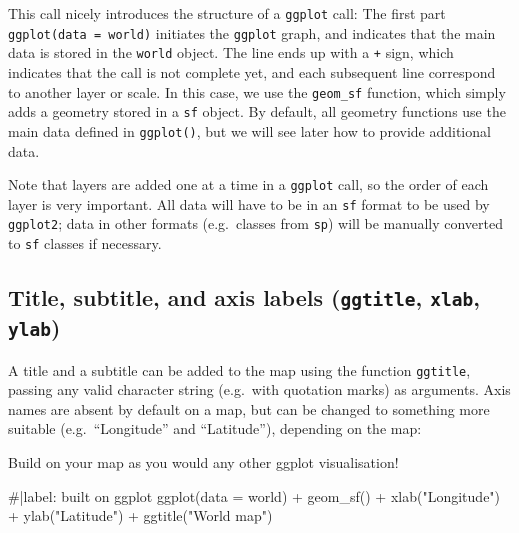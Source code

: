 \documentclass[
  letterpaper,
  DIV=11,
  numbers=noendperiod]{scrartcl}
\newenvironment{Shaded}{\begin{snugshade}}{\end{snugshade}}
\newcommand{\AttributeTok}[1]{\textcolor[rgb]{0.40,0.45,0.13}{#1}}
\newcommand{\CommentTok}[1]{\textcolor[rgb]{0.37,0.37,0.37}{#1}}
\newcommand{\FunctionTok}[1]{\textcolor[rgb]{0.28,0.35,0.67}{#1}}
\newcommand{\NormalTok}[1]{\textcolor[rgb]{0.00,0.23,0.31}{#1}}
\newcommand{\SpecialCharTok}[1]{\textcolor[rgb]{0.37,0.37,0.37}{#1}}
\newcommand{\StringTok}[1]{\textcolor[rgb]{0.13,0.47,0.30}{#1}}
\begin{document}
This call nicely introduces the structure of a \texttt{ggplot} call: The
first part \texttt{ggplot(data\ =\ world)} initiates the \texttt{ggplot}
graph, and indicates that the main data is stored in the \texttt{world}
object. The line ends up with a \texttt{+} sign, which indicates that
the call is not complete yet, and each subsequent line correspond to
another layer or scale. In this case, we use the \texttt{geom\_sf}
function, which simply adds a geometry stored in a \texttt{sf} object.
By default, all geometry functions use the main data defined in
\texttt{ggplot()}, but we will see later how to provide additional data.

Note that layers are added one at a time in a \texttt{ggplot} call, so
the order of each layer is very important. All data will have to be in
an \texttt{sf} format to be used by \texttt{ggplot2}; data in other
formats (e.g.~classes from \texttt{sp}) will be manually converted to
\texttt{sf} classes if necessary.

\hypertarget{title-subtitle-and-axis-labels-ggtitle-xlab-ylab}{%
\subsection{\texorpdfstring{Title, subtitle, and axis labels
(\texttt{ggtitle}, \texttt{xlab},
\texttt{ylab})}{Title, subtitle, and axis labels (ggtitle, xlab, ylab)}}\label{title-subtitle-and-axis-labels-ggtitle-xlab-ylab}}

A title and a subtitle can be added to the map using the function
\texttt{ggtitle}, passing any valid character string (e.g.~with
quotation marks) as arguments. Axis names are absent by default on a
map, but can be changed to something more suitable (e.g.~``Longitude''
and ``Latitude''), depending on the map:

Build on your map as you would any other ggplot visualisation!

\begin{Shaded}
\begin{Highlighting}[]
\CommentTok{\#|label: built on ggplot}
\FunctionTok{ggplot}\NormalTok{(}\AttributeTok{data =}\NormalTok{ world) }\SpecialCharTok{+}     
  \FunctionTok{geom\_sf}\NormalTok{() }\SpecialCharTok{+}     
  \FunctionTok{xlab}\NormalTok{(}\StringTok{"Longitude"}\NormalTok{) }\SpecialCharTok{+} 
  \FunctionTok{ylab}\NormalTok{(}\StringTok{"Latitude"}\NormalTok{) }\SpecialCharTok{+}     
  \FunctionTok{ggtitle}\NormalTok{(}\StringTok{"World map"}\NormalTok{) }
\end{Highlighting}
\end{Shaded}
\end{document}
